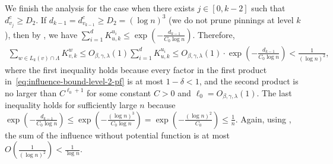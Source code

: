 \documentclass[11pt]{amsart}
\theoremstyle{definition}
\theoremstyle{remark}
\begin{document}
We finish the analysis for the case when there exists $j\in [0,k-2]$ such that $d_{v_j}^c \geq D_2$. 
If $d_{k-1}=d_{v_{k-1}}^c\geq D_2 = (\log n)^3$ (we do not prune pinnings at level $k$), then by , we have $\sum_{i=1}^{d} K_{u,k}^{u_i} \leq \exp(-\frac{d_{k-1}}{C_0 \log n})$. Therefore, 
\begin{align*}
    \sum_{w\in L_k(v) \cap \Lambda}K_{v,k}^{w}\leq O_{\beta,\gamma,\lambda}(1)\sum_{i=1}^{d} K_{u,k}^{u_i} \leq O_{\beta,\gamma,\lambda}(1) \cdot \exp\left(-\frac{d_{k-1}}{C_0 \log n}\right) < \frac{1}{(\log n)^2},
\end{align*}
where the first inequality holds because every factor in the first product in~\eqref{eq:influence-bound-level-2-pf} is at most $ 1 - \delta < 1$, and the second product is no larger than $C^{\ell_0+1}$ for some constant $C>0$ and $\ell_0=O_{\beta,\gamma,\lambda}(1)$. The last inequality holds for sufficiently large $n$ because $\exp\left (-\frac{d_{k-1}}{C_0 \log n}\right )\leq \exp\left(-\frac{(\log n)^3}{C_0 \log n}\right) = \exp\left(-\frac{(\log n)^2}{C_0}\right) \leq \frac{1}{n}$. Again, using , the sum of the influence without potential function is at most $O(\frac{1}{(\log n)^2}) < \frac{1}{\log n}$.
\end{document}
